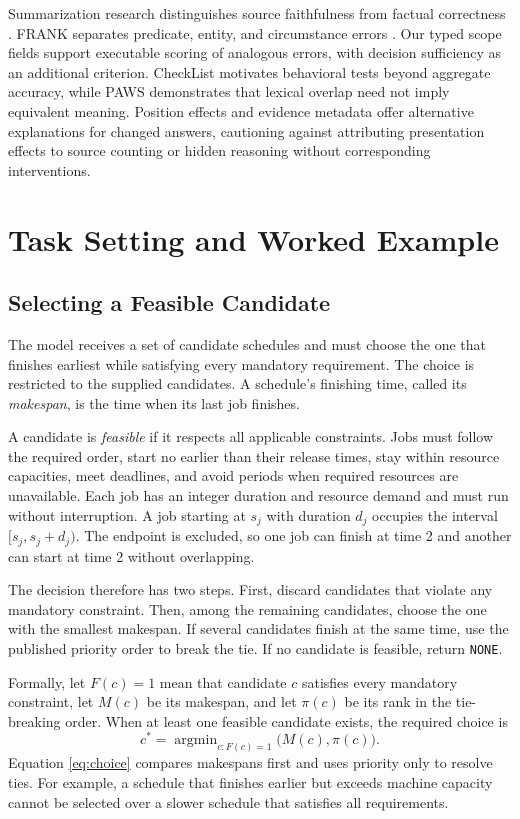 \documentclass{svproc}
\begin{document}
Summarization research distinguishes source faithfulness from factual correctness \cite{maynez}. FRANK separates predicate, entity, and circumstance errors \cite{frank}. Our typed scope fields support executable scoring of analogous errors, with decision sufficiency as an additional criterion. CheckList \cite{checklist} motivates behavioral tests beyond aggregate accuracy, while PAWS \cite{paws} demonstrates that lexical overlap need not imply equivalent meaning. Position effects \cite{middle} and evidence metadata \cite{metadata} offer alternative explanations for changed answers, cautioning against attributing presentation effects to source counting or hidden reasoning without corresponding interventions.




\section{Task Setting and Worked Example}

\subsection{Selecting a Feasible Candidate}

The model receives a set of candidate schedules and must choose the one that finishes earliest while satisfying every mandatory requirement. The choice is restricted to the supplied candidates. A schedule's finishing time, called its \emph{makespan}, is the time when its last job finishes.

A candidate is \emph{feasible} if it respects all applicable constraints. Jobs must follow the required order, start no earlier than their release times, stay within resource capacities, meet deadlines, and avoid periods when required resources are unavailable. Each job has an integer duration and resource demand and must run without interruption. A job starting at $s_j$ with duration $d_j$ occupies the interval $[s_j,s_j+d_j)$. The endpoint is excluded, so one job can finish at time 2 and another can start at time 2 without overlapping.

The decision therefore has two steps. First, discard candidates that violate any mandatory constraint. Then, among the remaining candidates, choose the one with the smallest makespan. If several candidates finish at the same time, use the published priority order to break the tie. If no candidate is feasible, return \texttt{NONE}.

Formally, let $F(c)=1$ mean that candidate $c$ satisfies every mandatory constraint, let $M(c)$ be its makespan, and let $\pi(c)$ be its rank in the tie-breaking order. When at least one feasible candidate exists, the required choice is
\begin{equation}
 c^*=\mathop{\arg\min}_{c:F(c)=1}\bigl(M(c),\pi(c)\bigr).
\label{eq:choice}
\end{equation}
Equation \ref{eq:choice} compares makespans first and uses priority only to resolve ties. For example, a schedule that finishes earlier but exceeds machine capacity cannot be selected over a slower schedule that satisfies all requirements.
\end{document}
